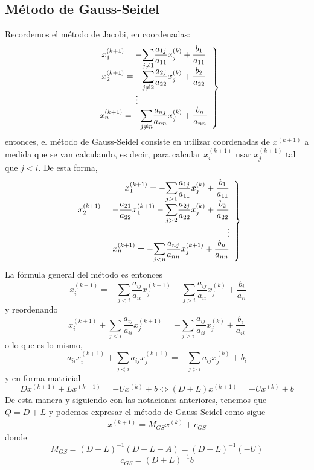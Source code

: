     \subsection{Método de Gauss-Seidel}
    \begin{met}
    Recordemos el método de Jacobi, en coordenadas:
    $$\left.\begin{array}{c}
    x_1^{(k+1)}=-\mathlarger{\sum_{j \neq 1}} \dfrac{a_{1j}}{a_{11}} x_j^{(k)} + \dfrac{b_1}{a_{11}}\\  
    \vspace{-5mm} \\ x_2^{(k+1)}=-\mathlarger{\sum_{j \neq 2}} \dfrac{a_{2j}}{a_{22}} x_j^{(k)} + \dfrac{b_2}{a_{22}}\\
    \vdots \qquad \qquad \\
    x_n^{(k+1)}=-\mathlarger{\sum_{j \neq n}} \dfrac{a_{nj}}{a_{nn}} x_j^{(k)} + \dfrac{b_n}{a_{nn}} \end{array} \right\}$$
    entonces, el método de Gauss-Seidel consiste en utilizar coordenadas de $x^{(k+1)}$ a medida que se van calculando, es decir, para calcular $x_i^{(k+1)}$ usar $x_{j}^{(k+1)}$ tal que $j<i$. De esta forma, 
    $$\left.\begin{array}{r}
    x_1^{(k+1)}=-\mathlarger{\sum_{j > 1}} \dfrac{a_{1j}}{a_{11}} x_j^{(k)} + \dfrac{b_1}{a_{11}}\\  \vspace{-5mm} \\ x_2^{(k+1)}=-\dfrac{a_{21}}{a_{22}}  x_1^{(k+1)} -\mathlarger{\sum_{j > 2}} \dfrac{a_{2j}}{a_{22}} x_j^{(k)} + \dfrac{b_2}{a_{22}}\\
    \vdots \\
    x_n^{(k+1)}=-\mathlarger{\sum_{j <n}} \dfrac{a_{nj}}{a_{nn}} x_j^{(k+1)} + \dfrac{b_n}{a_{nn}} \end{array} \right\}$$
    La fórmula general del método es entonces
    $$ \; x_i^{(k+1)}=-\sum_{j<i} \dfrac{a_{ij}}{a_{ii}} x_j^{(k+1)} - \sum_{j>i} \dfrac{a_{ij}}{a_{ii}} x_j^{(k)} + \dfrac{b_i}{a_{ii}}$$
    y reordenando
    $$x_i^{(k+1)}+\sum_{j<i} \dfrac{a_{ij}}{a_{ii}} x_j^{(k+1)}= - \sum_{j>i} \dfrac{a_{ij}}{a_{ii}} x_j^{(k)} + \dfrac{b_i}{a_{ii}}$$
    o lo que es lo mismo, 
    $$a_{ii} x_i^{(k+1)}+\sum_{j<i} a_{ij} x_j^{(k+1)}= - \sum_{j>i} a_{ij} x_j^{(k)} + b_i$$
    y en forma matricial
    $$Dx^{(k+1)}+Lx^{(k+1)} = -Ux^{(k)}+b \iff (D+L)x^{(k+1)}= -Ux^{(k)}+b $$
    De esta manera y siguiendo con las notaciones anteriores, tenemos que $Q=D+L$ y podemos expresar el método de Gauss-Seidel como sigue
    \begin{align}
     x^{(k+1)}=M_{GS} x^{(k)} + c_{GS}
     \label{met:gauss}
    \end{align}
    donde
    $$M_{GS}=(D+L)^{-1}(D+L-A)=(D+L)^{-1}(-U)$$
    $$c_{GS}=(D+L)^{-1} b$$
    
    \end{met}
